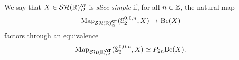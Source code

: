 \begin{dfn}
  We say that $X \in \SHRat$ is \emph{slice simple} if, for all $n \in \mathbb{Z}$, the natural map
  \[ \Map_{\SHRat} (\Ss_2^{0,0,n}, X) \to \b(X)\]
  factors through an equivalence
  \[ \Map_{\SHRat} (\Ss_2^{0,0,n}, X) \simeq P_{2n} \b(X).\]
\end{dfn}
%
%
%
%
%
%
%
%
%
%

